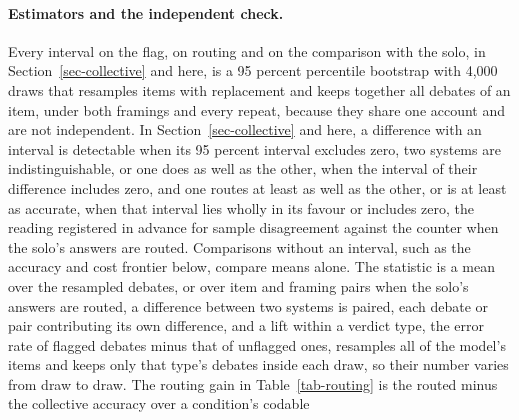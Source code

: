 \paragraph{Estimators and the independent check.}
Every interval on the flag, on routing and on the comparison with the solo,
in Section~\ref{sec-collective} and here, is a 95 percent percentile bootstrap
with 4,000 draws that resamples items with replacement and keeps together all
debates of an item, under both framings and every repeat, because they share
one account and are not independent. In Section~\ref{sec-collective} and
here, a difference with an interval is detectable when its 95 percent
interval excludes zero, two systems are indistinguishable, or one does as
well as the other, when the interval of their difference includes zero, and
one routes at least as well as the other, or is at least as accurate, when
that interval lies wholly in its favour or includes zero, the reading
registered in advance for sample disagreement against the counter when the
solo's answers are routed. Comparisons without an interval, such as the
accuracy and cost frontier below, compare means alone.
The statistic is a mean over the
resampled debates, or over item and framing pairs when the solo's answers are
routed, a difference between two systems is paired, each debate or pair
contributing its own difference, and a lift within a verdict type, the error
rate of flagged debates minus that of unflagged ones, resamples all of the
model's items and keeps only that type's debates inside each draw, so their
number varies from draw to draw. The routing gain in Table~\ref{tab-routing}
is the routed minus the collective accuracy over a condition's codable
